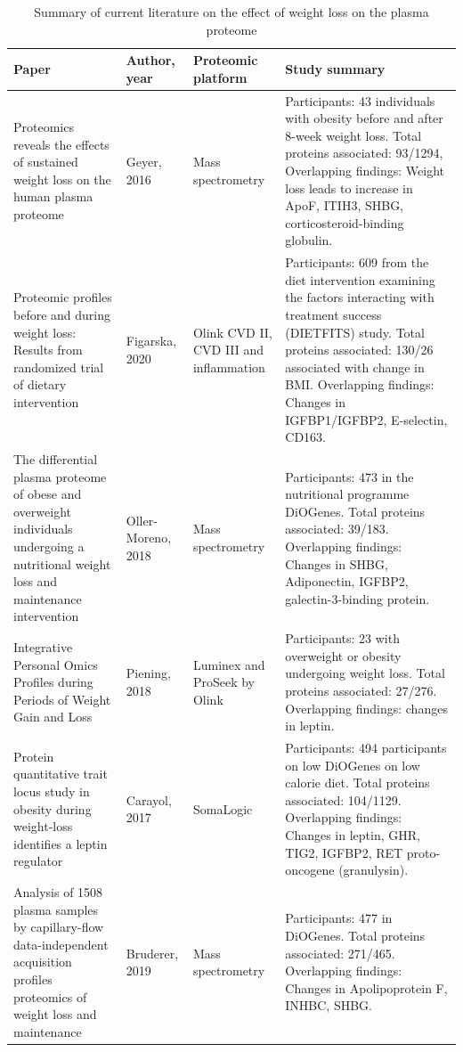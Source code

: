 \documentclass[11pt,twoside]{bristolthesis}
\begin{document}
\begin{landscape}\begin{table}

\caption{\label{tab:weight-loss-protein}Summary of current literature on the effect of weight loss on the plasma proteome}
\centering
\begin{tabu} to 
\toprule
Paper & Author, year & Proteomic platform & Study summary\\
\midrule
Proteomics reveals the effects of sustained weight loss on the human plasma proteome & Geyer, 2016 & Mass spectrometry & Participants: 43 individuals with obesity before and after 8-week weight loss.
Total proteins associated: 93/1294,
Overlapping findings: Weight loss leads to increase in ApoF, ITIH3, SHBG, corticosteroid-binding globulin.\\
Proteomic profiles before and during weight loss: Results from randomized trial of dietary intervention & Figarska, 2020 & Olink CVD II, CVD III and inflammation & Participants: 609 from the diet intervention examining the factors interacting with treatment success (DIETFITS) study.
Total proteins associated: 130/26 associated with change in BMI.
Overlapping findings: Changes in IGFBP1/IGFBP2, E-selectin, CD163.\\
The differential plasma proteome of obese and overweight individuals undergoing a nutritional weight loss and maintenance intervention & Oller-Moreno, 2018 & Mass spectrometry & Participants: 473 in the nutritional programme DiOGenes.
Total proteins associated: 39/183.
Overlapping findings: Changes in SHBG, Adiponectin, IGFBP2, galectin-3-binding protein.\\
Integrative Personal Omics Profiles during Periods of Weight Gain and Loss & Piening, 2018 & Luminex and ProSeek by Olink & Participants: 23 with overweight or obesity undergoing weight loss.
Total proteins associated: 27/276.
Overlapping findings: changes in leptin.\\
Protein quantitative trait locus study in obesity during weight-loss identifies a leptin regulator & Carayol, 2017 & SomaLogic & Participants: 494 participants on low DiOGenes on low calorie diet.
Total proteins associated: 104/1129.
Overlapping findings: Changes in leptin, GHR, TIG2, IGFBP2, RET proto-oncogene (granulysin).\\
\addlinespace
Analysis of 1508 plasma samples by capillary-flow data-independent acquisition profiles proteomics of weight loss and maintenance & Bruderer, 2019 & Mass spectrometry & Participants: 477 in DiOGenes.
Total proteins associated: 271/465.
Overlapping findings: Changes in Apolipoprotein F, INHBC, SHBG.\\
\bottomrule
\end{tabu}
\end{table}
\end{landscape}
\end{document}
